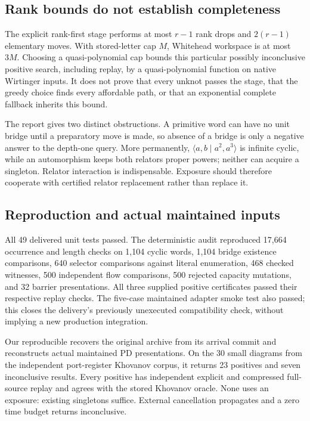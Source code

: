 \subsection{Rank bounds do not establish completeness}

The explicit rank-first stage performs at most $r-1$ rank drops and
$2(r-1)$ elementary moves. With stored-letter cap $M$, Whitehead workspace
is at most $3M$. Choosing a quasi-polynomial cap bounds this particular
possibly inconclusive positive search, including replay, by a quasi-polynomial
function on native Wirtinger inputs. It does not prove that every unknot
passes the stage, that the greedy choice finds every affordable path, or
that an exponential complete fallback inherits this bound.

The report gives two distinct obstructions. A primitive word can have no
unit bridge until a preparatory move is made, so absence of a bridge is only
a negative answer to the depth-one query. More permanently,
$\langle a,b\mid a^2,a^3\rangle$ is infinite cyclic, while an automorphism
keeps both relators proper powers; neither can acquire a singleton.
Relator interaction is indispensable. Exposure should therefore cooperate
with certified relator replacement rather than replace it.

\subsection{Reproduction and actual maintained inputs}

All 49 delivered unit tests passed. The deterministic audit reproduced
17,664 occurrence and length checks on 1,104 cyclic words, 1,104 bridge
existence comparisons, 640 selector comparisons against literal enumeration,
468 checked witnesses, 500 independent flow comparisons, 500 rejected
capacity mutations, and 32 barrier presentations. All three supplied
positive certificates passed their respective replay checks. The five-case
maintained adapter smoke test also passed; this closes the delivery's
previously unexecuted compatibility check, without implying a new production
integration.

Our reproducible  recovers the original
archive from its arrival commit and reconstructs actual maintained PD
presentations. On the 30 small diagrams from the independent port-register
Khovanov corpus, it returns 23 positives and seven inconclusive results.
Every positive has independent explicit and compressed full-source replay
and agrees with the stored Khovanov oracle. None uses an exposure: existing
singletons suffice. External cancellation propagates and a zero time budget
returns inconclusive.

